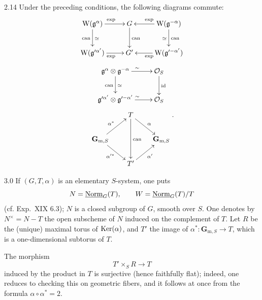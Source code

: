 \begin{lemma}{2.14}\label{XX.2.14}
Under the preceding conditions, the following diagrams commute:
\[
\xymatrix{
\mathrm W(\mathfrak g^\alpha)\ar[r]^{\exp}\ar[d]_{\mathrm{can}}^{\simeq}&G\ar[d]^{\mathrm{can}}&\mathrm W(\mathfrak g^{-\alpha})\ar[l]_{\exp}\ar[d]^{\mathrm{can}}_{\simeq}\\
\mathrm W(\mathfrak g'^{\alpha'})\ar[r]_{\exp}&G'&\mathrm W(\mathfrak g'^{-\alpha'})\ar[l]^{\exp}
}
\]
\[
\xymatrix{
\mathfrak g^\alpha\otimes\mathfrak g^{-\alpha}\ar[r]^{\sim}\ar[d]_{\mathrm{can}}^{\simeq}&\OS\ar[d]^{\mathrm{id}}\\
\mathfrak g'^{\alpha'}\otimes\mathfrak g'^{-\alpha'}\ar[r]^{\sim}&\OS
}
\]
\[
\xymatrix@C=2em@R=2em{
&T\ar[dr]^\alpha\ar[dd]^{\mathrm{can}}&\\
\mathbf G_{\mathrm m,S}\ar[ur]^{\alpha^*}\ar[dr]_{\alpha'^*}&&\mathbf G_{\mathrm m,S}\\
&T'\ar[ur]_{\alpha'}&
}.
\]
\end{lemma}

\label{XX.sec.3}
\begin{notation}{3.0}\label{XX.3.0}
{\renewcommand{\thefootnote}{(23)}}%
If $(G,T,\alpha)$ is an elementary $S$-system, one puts
\[
N=\underline{\mathrm{Norm}}_G(T),\qquad W=\underline{\mathrm{Norm}}_G(T)/T
\]
(cf. Exp.~XIX 6.3); $N$ is a closed subgroup of $G$, smooth over $S$. One denotes by $N^\times=N-T$ the open subscheme of $N$ induced on the complement of $T$.{\renewcommand{\thefootnote}{(24)}} Let $R$ be the (unique) maximal torus of $\operatorname{Ker}(\alpha)$, and $T'$ the image of $\alpha^*:\mathbf G_{\mathrm m,S}\to T$, which is a one-dimensional subtorus of $T$.

The morphism
\[
T'\times_SR\to T
\]
induced by the product in $T$ is surjective (hence faithfully flat); indeed, one reduces to checking this on geometric fibers, and it follows at once from the formula $\alpha\circ\alpha^*=2$.
\end{notation}

